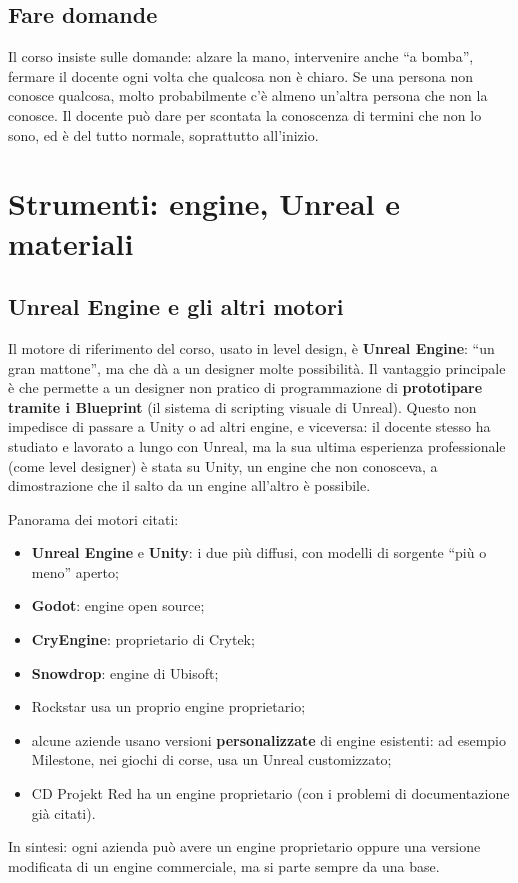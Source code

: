 \subsection{Fare domande}

Il corso insiste sulle domande: alzare la mano, intervenire anche ``a
bomba'', fermare il docente ogni volta che qualcosa non è chiaro. Se una
persona non conosce qualcosa, molto probabilmente c'è almeno un'altra persona
che non la conosce. Il docente può dare per scontata la conoscenza di termini
che non lo sono, ed è del tutto normale, soprattutto all'inizio.

\section{Strumenti: engine, Unreal e materiali}
\label{sec:engine}

\subsection{Unreal Engine e gli altri motori}

Il motore di riferimento del corso, usato in level design, è \textbf{Unreal
Engine}: ``un gran mattone'', ma che dà a un designer molte possibilità. Il
vantaggio principale è che permette a un designer non pratico di
programmazione di \textbf{prototipare tramite i Blueprint} (il sistema di
scripting visuale di Unreal). Questo non impedisce di passare a Unity o ad
altri engine, e viceversa: il docente stesso ha studiato e lavorato a lungo
con Unreal, ma la sua ultima esperienza professionale (come level designer) è
stata su Unity, un engine che non conosceva, a dimostrazione che il salto da
un engine all'altro è possibile.

Panorama dei motori citati:
\begin{itemize}
  \item \textbf{Unreal Engine} e \textbf{Unity}: i due più diffusi, con
        modelli di sorgente ``più o meno'' aperto;
  \item \textbf{Godot}: engine open source;
  \item \textbf{CryEngine}: proprietario di Crytek;
  \item \textbf{Snowdrop}: engine di Ubisoft;
  \item Rockstar usa un proprio engine proprietario;
  \item alcune aziende usano versioni \textbf{personalizzate} di engine
        esistenti: ad esempio Milestone, nei giochi di corse, usa un Unreal
        customizzato;
  \item CD Projekt Red ha un engine proprietario (con i problemi di
        documentazione già citati).
\end{itemize}
In sintesi: ogni azienda può avere un engine proprietario oppure una versione
modificata di un engine commerciale, ma si parte sempre da una base.

